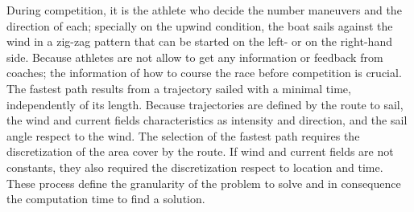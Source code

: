 During competition, it is the athlete who decide the number maneuvers and the direction of each; specially on the upwind condition, the boat sails against the wind
in a zig-zag pattern that can be started on the left- or on the right-hand side. %
Because athletes are not allow to get any information or feedback from coaches; the information of how to course the race before competition is crucial. \newline
The fastest path results from a trajectory sailed with a minimal time, independently of its length. Because trajectories are defined by the route to sail, the wind and current fields characteristics as intensity and direction, and the sail angle respect to the wind. The selection of the fastest path requires the discretization of the area cover by the route. If wind and current fields are not constants, they also required the discretization respect to location and time. These process define the granularity of the problem to solve and in consequence the computation time to find a solution. %

